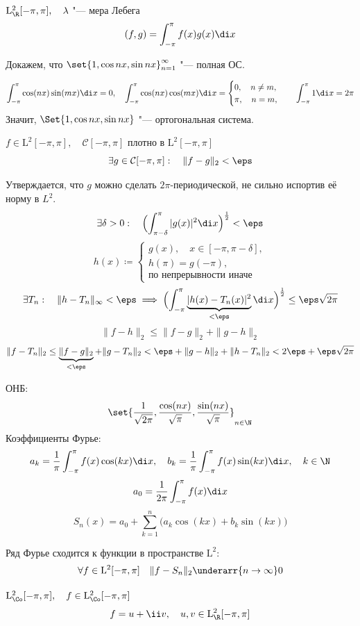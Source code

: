 \begin{exmpls}
\item $ \mathrm L_\R^2[-\pi, \pi], \quad \lambda $ "--- мера Лебега
	$$ (f, g) = \int_{-\pi}^\pi f(x)g(x) \di x $$

	Докажем, что $ \set{1, \cos nx, \sin nx}_{n = 1}^\infty $ "--- полная ОС.

	$$ \int_{-\pi}^\pi \cos(nx) \sin (mx) \di x = 0, \quad
	\int_{-\pi}^\pi \cos(nx) \cos (mx) \di x =
	\begin{cases}
		0, \quad n \ne m, \\
		\pi, \quad n = m,
	\end{cases} \quad \int_{-\pi}^\pi 1 \di x = 2\pi $$
	Значит, $ \Set{1, \cos nx, \sin nx} $ "--- ортогональная система.

	$ f \in \mathrm L^2[-\pi, \pi], \quad \mathcal C[-\pi, \pi] $ плотно в $ \mathrm L^2[-\pi, \pi] $
	$$ \exists g \in \mathcal C[-\pi, \pi] : \quad \|f - g\|_2 < \eps $$

	Утверждается, что $ g $ можно сделать $ 2\pi $-периодической, не сильно испортив её норму
	в $ L^2 $.
	$$ \exists \delta > 0 : \quad
	\Bigl( \int_{\pi - \delta}^\pi |g(x)|^2 \di x \Bigr)^{\frac12} < \eps $$
	$$ h(x) \coloneq
	\begin{cases}
		g(x), \quad x \in [-\pi, \pi - \delta], \\
		h(\pi) = g(-\pi), \\
		\text{по непрерывности иначе}
	\end{cases} $$
	$$ \exists T_n : \quad \|h - T_n\|_\infty < \eps \implies
	\Bigl( \int_{-\pi}^\pi \underbrace{|h(x) - T_n(x)|^2}_{< \eps} \di x \Bigr)^{\frac12} \le
	\eps \sqrt{2\pi} $$
	$$ \|f - h\|_2 \le \|f - g\|_2 + \|g - h\|_2 $$
	$$ \|f - T_n\|_2 \le \underbrace{\|f - g\|_2}_{< \eps} + \|g - T_n\|_2 <
	\eps + \|g - h\|_2 + \|h - T_n\|_2 < 2\eps + \eps \sqrt{2\pi} $$

	ОНБ:
	$$ \set{\frac1{\sqrt{2\pi}}, \frac{\cos(nx)}{\sqrt\pi}, \frac{\sin(nx)}{\sqrt\pi}}_{n \in \N} $$
	Коэффициенты Фурье:
	$$ a_k = \frac1\pi \int_{-\pi}^\pi f(x) \cos (kx) \di x, \quad
	b_k = \frac1\pi \int_{-\pi}^\pi f(x) \sin (kx) \di x, \quad k \in \N $$
	$$ a_0 = \frac1{2\pi} \int_{-\pi}^\pi f(x) \di x $$
	$$ S_n(x) = a_0 + \sum_{k = 1}^n \bigl( a_k \cos(kx) + b_k \sin(kx) \bigr) $$

	Ряд Фурье сходится к функции в пространстве $ \mathrm L^2 $:
	$$ \forall f \in \mathrm L^2 [-\pi, \pi] \quad \|f - S_n\|_2 \underarr{n \to \infty} 0 $$
\item $ \mathrm L_\Co^2 [-\pi, \pi], \quad f \in \mathrm L_\Co^2 [-\pi, \pi] $
	$$ f = u + \ii v, \quad u, v \in \mathrm L_\R^2 [-\pi, \pi] $$


\end{exmpls}
